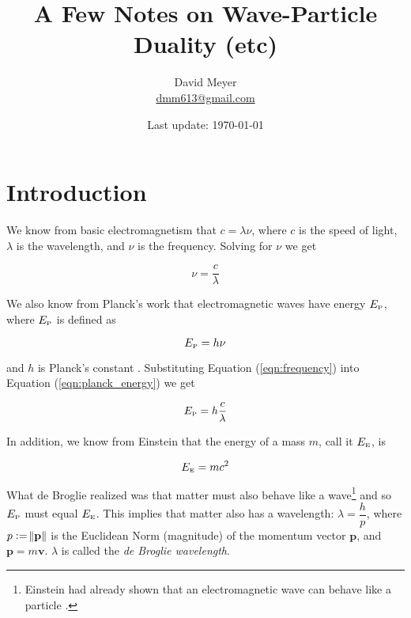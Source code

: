 \documentclass{article}
\title{A Few Notes on Wave-Particle Duality (etc)}
\author{David Meyer \\ \href{mailto:dmm613@gmail.com}
                            {dmm613@gmail.com}}
\date{Last update: \today}
\theoremstyle{definition}
\begin{document}
\maketitle
%
%
%
\section{Introduction}

\smallskip
\noindent
We know from basic electromagnetism
\cite{wiki:electromagnetic_radiation} that $c = \lambda \nu$,
where $c$ is the speed of light, $\lambda$ is the wavelength, and
$\nu$ is the frequency. Solving for $\nu$ we get


\bigskip
\begin{equation}
	\nu = \dfrac{c}{\lambda}
	\label{eqn:frequency}
\end{equation}

\bigskip
\noindent
We also know from Planck's work \cite{planck_energy} that
electromagnetic waves have energy $E_{\text{{\tiny P}}}$, where
$E_{\text{{\tiny P}}}$ is defined as


\smallskip
\begin{equation}
	E_{\text{{\tiny P}}} = h \nu
	\label{eqn:planck_energy}
\end{equation}


\bigskip
\noindent
and $h$ is Planck's constant \cite{wiki:plancks_constant}. 
Substituting Equation (\ref{eqn:frequency}) into Equation 
(\ref{eqn:planck_energy}) we get

\medskip
\begin{equation*}
	E_{\text{{\tiny P}}} = h \dfrac{c}{\lambda}
	\label{eqn:planck_c_over_lambda}
\end{equation*}

\medskip
\noindent
In addition, we know from Einstein
\cite{wiki:mass_energy_equivalence} that the energy of a mass
$m$, call it $E_{\text{{\tiny E}}}$, is


\begin{equation*}
	E_{\text{{\tiny E}}} = mc^2
	\label{eqn:E=mc^2}
\end{equation*}


{
\noindent
What de Broglie \cite{wiki:de_broglie} realized was that matter
must also behave like a wave\footnote{Einstein had already shown
that an electromagnetic wave can behave like a particle
\cite{wiki:photoelectric_effect}.}
\cite{wiki:matter_wave,wiki:wave_particle_duality} and so
$E_{\text{{\tiny P}}}$ must equal $E_{\text{{\tiny E}}}$.  This
implies that matter also has a wavelength: $\lambda =
\dfrac{h}{p}$, where $p := \norm{\mathbf{p}}$ is the Euclidean
Norm \cite{dmm:vector_calculus} (magnitude) of the momentum vector 
$\mathbf{p}$, and $\mathbf{p} = m \mathbf{v}$. $\lambda$ is called 
the \emph{de Broglie wavelength}.
\par}
\end{document}
